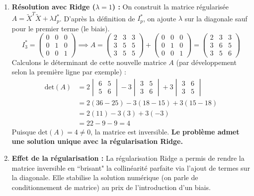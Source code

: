 \documentclass[solutions]{../exercices}
\begin{document}
\begin{solution}
\begin{enumerate}
		\item \textbf{Résolution avec Ridge ($\lambda = 1$) :}
		On construit la matrice régularisée $A = \tilde{X}^T \tilde{X} + \lambda I_p^*$.
		D'après la définition de $I_p^*$, on ajoute $\lambda$ sur la diagonale sauf pour le premier terme (le biais).
		\[ I_3^* = \begin{pmatrix} 0 & 0 & 0 \\ 0 & 1 & 0 \\ 0 & 0 & 1 \end{pmatrix} \implies A = \begin{pmatrix} 2 & 3 & 3 \\ 3 & 5 & 5 \\ 3 & 5 & 5 \end{pmatrix} + \begin{pmatrix} 0 & 0 & 0 \\ 0 & 1 & 0 \\ 0 & 0 & 1 \end{pmatrix} = \begin{pmatrix} 2 & 3 & 3 \\ 3 & 6 & 5 \\ 3 & 5 & 6 \end{pmatrix} \]
		Calculons le déterminant de cette nouvelle matrice $A$ (par développement selon la première ligne par exemple) :
		\[
		\begin{aligned}
			\text{det}(A) &= 2 \begin{vmatrix} 6 & 5 \\ 5 & 6 \end{vmatrix} - 3 \begin{vmatrix} 3 & 5 \\ 3 & 6 \end{vmatrix} + 3 \begin{vmatrix} 3 & 6 \\ 3 & 5 \end{vmatrix} \\
			&= 2(36 - 25) - 3(18 - 15) + 3(15 - 18) \\
			&= 2(11) - 3(3) + 3(-3) \\
			&= 22 - 9 - 9 = 4
		\end{aligned}
		\]
		Puisque $\text{det}(A) = 4 \neq 0$, la matrice est inversible. \textbf{Le problème admet une solution unique avec la régularisation Ridge.}

		\item \textbf{Effet de la régularisation :}
		La régularisation Ridge a permis de rendre la matrice inversible en ``brisant" la collinéarité parfaite via l'ajout de termes sur la diagonale. Elle stabilise la solution numérique (on parle de conditionnement de matrice) au prix de l'introduction d'un biais.


\end{enumerate}
\end{solution}
\end{document}
